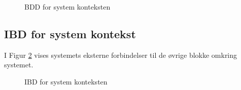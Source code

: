 \begin{figure}[h]
	\centering {}
	\caption{BDD for system konteksten}
	\label{fig:bddcontext}
\end{figure}

\clearpage

\subsection{IBD for system kontekst}
I Figur \ref{fig:IBDsystemContext} vises systemets eksterne forbindelser til de øvrige blokke omkring systemet.

\begin{figure}[h]
	\centering {}
	\caption{IBD for system konteksten}
	\label{fig:IBDsystemContext}
\end{figure}

